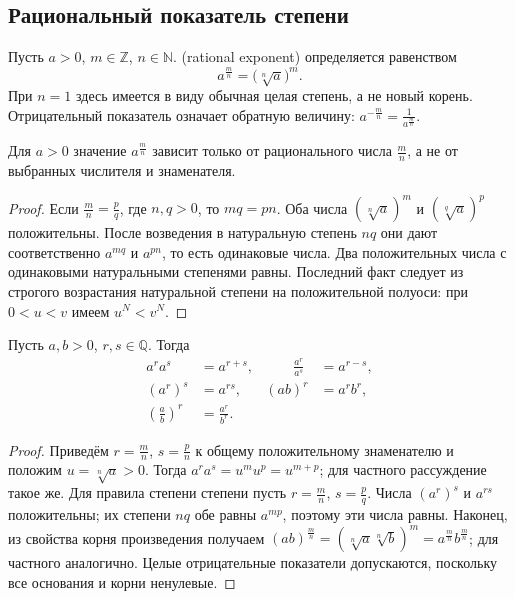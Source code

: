 \subsection{Рациональный показатель степени}
\begin{definition}
Пусть \(a>0\), \(m\in\mathbb Z\), \(n\in\mathbb N\).  (rational exponent) определяется равенством
\[
a^{\frac mn}=\bigl(\sqrt[n]a\bigr)^m.
\]
При \(n=1\) здесь имеется в виду обычная целая степень, а не новый корень. Отрицательный показатель означает обратную величину: \(a^{-\frac mn}=\frac{1}{a^{\frac mn}}\).
\end{definition}

\begin{theorem}\label{thm:legacy-c07-5}
Для \(a>0\) значение \(a^{\frac mn}\) зависит только от рационального числа \(\frac mn\), а не от выбранных числителя и знаменателя.
\end{theorem}
\begin{proof}
Если \(\frac mn=\frac pq\), где \(n,q>0\), то \(mq=pn\). Оба числа \((\sqrt[n]a)^m\) и \((\sqrt[q]a)^p\) положительны. После возведения в натуральную степень \(nq\) они дают соответственно \(a^{mq}\) и \(a^{pn}\), то есть одинаковые числа. Два положительных числа с одинаковыми натуральными степенями равны. Последний факт следует из строгого возрастания натуральной степени на положительной полуоси: при \(0<u<v\) имеем \(u^N<v^N\).
\end{proof}

\begin{theorem}\label{thm:legacy-c07-6}
Пусть \(a,b>0\), \(r,s\in\mathbb Q\). Тогда
\[
\begin{aligned}
a^r a^s&=a^{r+s},&\qquad \frac{a^r}{a^s}&=a^{r-s},\\
(a^r)^s&=a^{rs},&(ab)^r&=a^rb^r,\\
\left(\frac ab\right)^r&=\frac{a^r}{b^r}.
\end{aligned}
\]
\end{theorem}
\begin{proof}
Приведём \(r=\frac mn\), \(s=\frac pn\) к общему положительному знаменателю и положим \(u=\sqrt[n]a>0\). Тогда \(a^ra^s=u^mu^p=u^{m+p}\); для частного рассуждение такое же. Для правила степени степени пусть \(r=\frac mn\), \(s=\frac pq\). Числа \((a^r)^s\) и \(a^{rs}\) положительны; их степени \(nq\) обе равны \(a^{mp}\), поэтому эти числа равны. Наконец, из свойства корня произведения получаем \((ab)^{\frac mn}=(\sqrt[n]a\sqrt[n]b)^m=a^{\frac mn}b^{\frac mn}\); для частного аналогично. Целые отрицательные показатели допускаются, поскольку все основания и корни ненулевые.
\end{proof}

